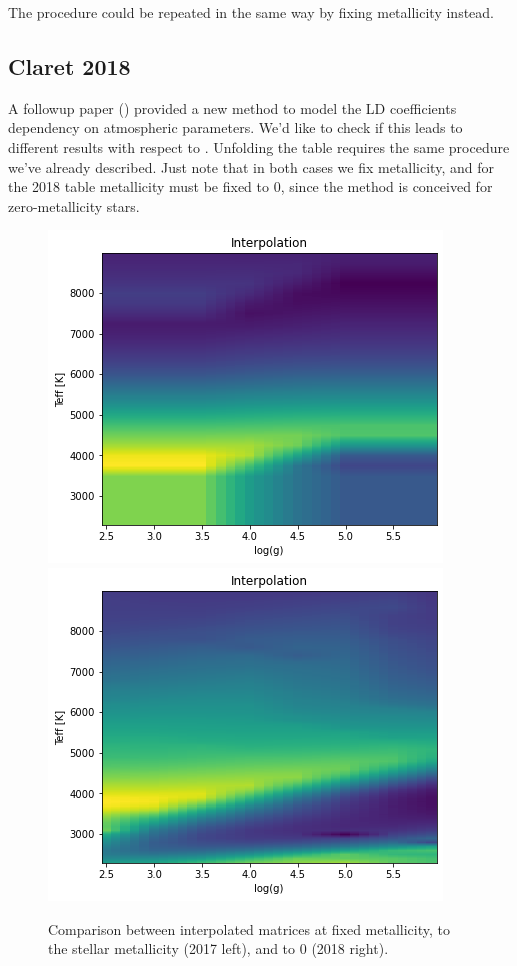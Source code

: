 \documentclass[a4paper,11pt,twocolumn]{article}
\begin{document}
The procedure could be repeated in the same way by fixing metallicity instead.




\subsection{Claret 2018}
A followup paper (\cite{claret2018}) provided a new method to model the LD coefficients dependency 
on atmospheric parameters. We'd like to check if this leads to different results 
with respect to \cite{claret2017}. Unfolding the table requires the same procedure 
we've already described. Just note that in both cases we fix metallicity, and for 
the 2018 table metallicity must be fixed to 0, since the method is conceived for
zero-metallicity stars.
\begin{figure}[H]
    \centering  
    \includegraphics[scale=0.5, angle=0]{../pictures/ClaretvClaret/2017.png}
    \includegraphics[scale=0.5, angle=0]{../pictures/ClaretvClaret/2018.png}
    \caption{Comparison between interpolated matrices at fixed metallicity, to the 
    stellar metallicity (2017 left), and to 0 (2018 right).}
\end{figure}
\end{document}
